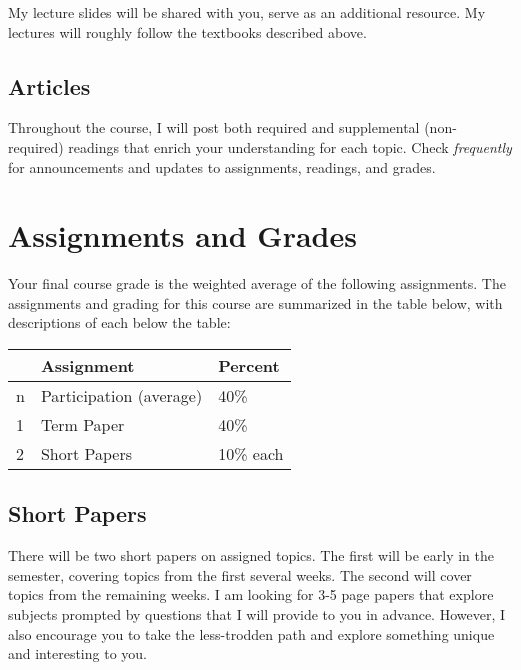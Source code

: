 \documentclass{article}
\begin{document}
My lecture slides will be shared with you, serve as an additional
resource. My lectures will roughly follow the textbooks described above.

\hypertarget{articles}{%
\subsection*{Articles}\label{articles}}

Throughout the course, I will post both required and supplemental
(non-required) readings that enrich your understanding for each topic.
Check \emph{frequently} for announcements and updates to assignments,
readings, and grades.

\hypertarget{assignments-and-grades}{%
\section*{Assignments and Grades}\label{assignments-and-grades}}

Your final course grade is the weighted average of the following
assignments. The assignments and grading for this course are summarized
in the table below, with descriptions of each below the table:

\begin{center}

\begin{tabular}{lll}
\toprule
 & Assignment & Percent\\
\midrule
n & Participation (average) & 40\%\\
1 & Term Paper & 40\%\\
2 & Short Papers & 10\% each\\
\bottomrule
\end{tabular}
\end{center}

\hypertarget{short-papers}{%
\subsection*{Short Papers}\label{short-papers}}

There will be two short papers on assigned topics. The first will be
early in the semester, covering topics from the first several weeks. The
second will cover topics from the remaining weeks. I am looking for 3-5
page papers that explore subjects prompted by questions that I will
provide to you in advance. However, I also encourage you to take the
less-trodden path and explore something unique and interesting to you.
\end{document}
